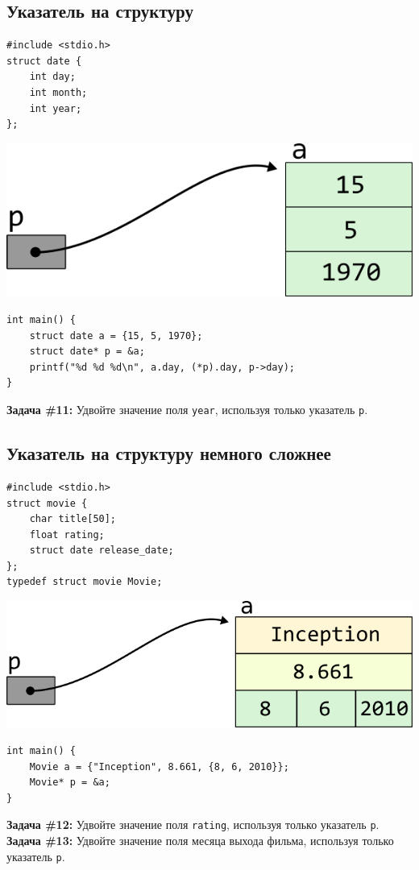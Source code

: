 \documentclass{article}
\begin{document}
\subsection*{Указатель на структуру}
\begin{multicols}{2}
\begin{lstlisting}
#include <stdio.h>
struct date {
	int day;
	int month;
	int year;
};
\end{lstlisting}
\columnbreak
\includegraphics[scale=1]{../images/pointer_schemes/pointer_to_struct_date.png}
\end{multicols}
\vspace{-5ex}
\begin{lstlisting}
int main() {
	struct date a = {15, 5, 1970};
	struct date* p = &a;
	printf("%d %d %d\n", a.day, (*p).day, p->day);
}
\end{lstlisting}
\textbf{Задача \#11:} Удвойте значение поля \texttt{year}, используя только указатель \texttt{p}.

\subsection*{Указатель на структуру немного сложнее}
\begin{multicols}{2}
\begin{lstlisting}
#include <stdio.h>
struct movie {
    char title[50];
    float rating;
    struct date release_date;
};
typedef struct movie Movie;
\end{lstlisting}
\columnbreak
\begin{center}
\includegraphics[scale=1]{../images/pointer_schemes/pointer_to_struct_movie.png}
\end{center}
\end{multicols}
\begin{lstlisting}
int main() {
	Movie a = {"Inception", 8.661, {8, 6, 2010}};
	Movie* p = &a;
}
\end{lstlisting}
\textbf{Задача \#12:} Удвойте значение поля \texttt{rating}, используя только указатель \texttt{p}.\\
\textbf{Задача \#13:} Удвойте значение поля месяца выхода фильма, используя только указатель \texttt{p}.
\end{document}
